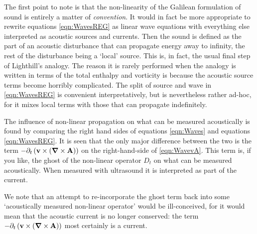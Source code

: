 \documentclass[10pt, fleqn,final,showtrims,oldfontcommands, article,a4paper,oneside]{memoir} %
\newcommand{\eqnref}[1]{\ref{eqn:#1}}
\newcommand{\lr}[1]{\left( #1 \right)}
\renewcommand{\d}{\partial}
\newcommand{\del}{\nabla}
\newcommand{\vdel}{ \mbox{\boldmath $\del$}}
\newcommand{\dt}{{\d_t}}
\newcommand{\Dt}{D_t}
\newcommand{\vA}{\textbf{A}}
\newcommand{\vv}{\textbf{v}}
\begin{document}
The first point to note is that the non-linearity of the Galilean formulation of sound is entirely a matter of {\em  convention}.
It would in fact be more appropriate to rewrite equations \eqnref{WavesREG} as linear wave equations with everything else interpreted as acoustic sources and currents.
Then the sound is defined as the part of an acoustic disturbance that can propagate energy away to infinity,
the rest of the disturbance being a `local' source.
This is, in fact, the usual final step of Lighthill's analogy.
The reason it is rarely performed when the analogy is written in terms of the total enthalpy and vorticity is because
the acoustic source terms become horribly complicated.
The split of source and wave in \eqnref{WavesREG} is convenient  interpretatively, but is nevertheless rather ad-hoc,
for it mixes local terms with those that can propagate indefinitely.

The influence of non-linear propagation on what can be measured acoustically is found by comparing the right hand sides of equations \eqnref{Waves} and equations \eqnref{WavesREG}.
It is seen that the only major difference between the two is the term $- \dt \lr{ \vv \times \lr{\vdel \times \vA}}$ on the right-hand-side of \eqnref{WavevA}.
This term is, if you like, the ghost of the non-linear operator $\Dt$ on what can be measured acoustically.
When measured with ultrasound it is interpreted  as part of the current.

We note that an attempt to re-incorporate the ghost  term back into some `acoustically measured non-linear operator' would be ill-conceived, 
for it would mean that the acoustic current is no longer conserved:
the term $- \dt \lr{ \vv \times \lr{\vdel \times \vA}}$ most certainly is a current.






\end{document}
